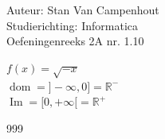 \documentclass[a4paper]{article}
\begin{document}
  
\noindent \large Auteur: Stan Van Campenhout \\
\noindent \large Studierichting:  Informatica\\
\noindent \large Oefeningenreeks 2A nr. 1.10\\

\medskip

\normalsize

$ f(x) = \sqrt{-x} $\\

$\operatorname{dom} = ]-\infty, 0] = \mathbb{R}^{-} $\\

$ \operatorname{Im} = [0, +\infty[ = \mathbb{R}^{+} $\\

\begin{thebibliography}{999}
\end{thebibliography}
\end{document}
